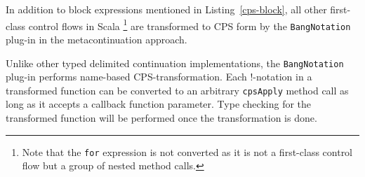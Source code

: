 \begin{description}

  In addition to block expressions mentioned in Listing~\ref{cps-block}, all other first-class control flows in Scala  \footnote{Note that the \lstinline{for} expression is not converted as it is not a first-class control flow but a group of nested method calls.} are transformed to CPS form by the \lstinline{BangNotation} plug-in in the metacontinuation \cite{Danvy1990AbstractingC} approach.

  Unlike other typed delimited continuation implementations, the \lstinline{BangNotation} plug-in performs name-based CPS-transformation. Each !-notation in a transformed function can be converted to an arbitrary \lstinline{cpsApply} method call as long as it accepts a callback function parameter. Type checking for the transformed function will be performed once the transformation is done.


\end{description}
